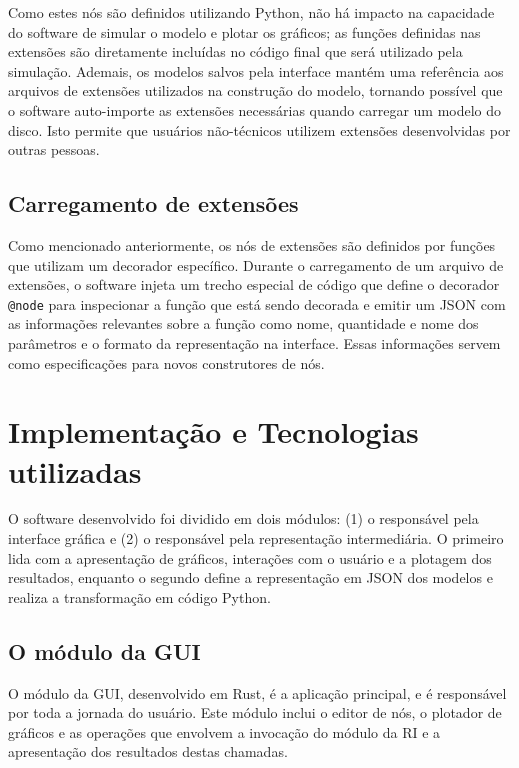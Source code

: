 \documentclass[
	12pt,				%
	openright,			%
	oneside,			%
	a4paper,			%
	main=brazil,
	english,			%
	]{ufsj-abntex2}
\begin{document}
Como estes nós são definidos utilizando Python, não há impacto na capacidade do software de simular o modelo e plotar os gráficos; as funções definidas nas extensões são diretamente incluídas no código final que será utilizado pela simulação. Ademais, os modelos salvos pela interface mantém uma referência aos arquivos de extensões utilizados na construção do modelo, tornando possível que o software auto-importe as extensões necessárias quando carregar um modelo do disco. Isto permite que usuários não-técnicos utilizem extensões desenvolvidas por outras pessoas.

\subsection{Carregamento de extensões}

Como mencionado anteriormente, os nós de extensões são definidos por funções que utilizam um decorador específico. Durante o carregamento de um arquivo de extensões, o software injeta um trecho especial de código que define o decorador \texttt{@node} para inspecionar a função que está sendo decorada e emitir um JSON com as informações relevantes sobre a função como nome, quantidade e nome dos parâmetros e o formato da representação na interface. Essas informações servem como especificações para novos construtores de nós.

\section{Implementação e Tecnologias utilizadas}
\label{sec:tecnologias}

O software desenvolvido foi dividido em dois módulos: (1) o responsável pela interface gráfica e (2) o responsável pela representação intermediária. O primeiro lida com a apresentação de gráficos, interações com o usuário e a plotagem dos resultados, enquanto o segundo define a representação em JSON dos modelos e realiza a transformação em código Python.

\subsection{O módulo da GUI}
\label{sub:gui}

O módulo da GUI, desenvolvido em Rust, é a aplicação principal, e é responsável por toda a jornada do usuário. Este módulo inclui o editor de nós, o plotador de gráficos e as operações que envolvem a invocação do módulo da RI e a apresentação dos resultados destas chamadas.
\end{document}
